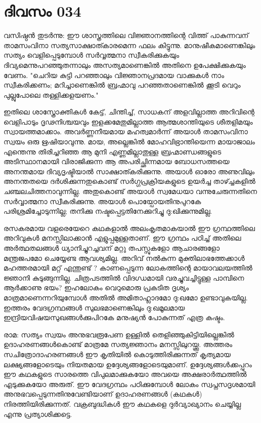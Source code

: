 \newpage
\section{ദിവസം 034}


വസിഷ്ഠന്‍ തുടര്‍ന്നു: ഈ ശാസ്ത്രത്തിലെ വിജ്ഞാനത്തിന്റെ വിത്ത്‌ പാകുന്നവന്‌  താമസംവിനാ സത്യസാക്ഷാത്കാരമെന്ന ഫലം കിട്ടുന്നു. മാനുഷീകമാണെങ്കിലും സത്യം വെളിപ്പെടുമ്പോള്‍ സര്‍വ്വത്മനാ സ്വീകരിക്കുകയും ദിവ്യമെന്നുപറഞ്ഞുതന്നാലും അസത്യമാണെങ്കില്‍ അതിനെ ഉപേക്ഷിക്കുകയും വേണം. "ചെറിയ കുട്ടി പറഞ്ഞാലും വിജ്ഞാനപ്രദമായ വാക്കുകള്‍ നാം സ്വീകരിക്കണം;  മറിച്ചാണെങ്കില്‍ ബ്രഹ്മാവു പറഞ്ഞതാണെങ്കില്‍ ക്കൂടി വെറും പുല്ലുപോലെ തള്ളിക്കളയണം."

ഇതിലെ ശാസ്ത്രോക്തികള്‍ കേട്ട്‌, ചിന്തിച്ച്‌, സാധകന്‌ അളവില്ലാത്ത അറിവിന്റെ വെളിപാടും ദൃഢനിശ്ചയവും ഇളക്കമേതുമില്ലാത്ത ആത്മശാന്തിയുടെ ശീതളിമയും സ്വായത്തമാക്കാം. അവര്‍ണ്ണനീയമായ മഹത്വമാര്‍ന്ന് അയാള്‍ താമസംവിനാ സ്വയം ഒരു ഋഷിയാവുന്നു. മായ, അല്ലെങ്കില്‍ മോഹവിഭ്രാന്തിയെന്ന മായാജാലം എന്തെന്നു തിരിച്ചറിഞ്ഞ ആ മുനി എണ്ണമില്ലാതുള്ള ബ്രഹ്മാണ്ഡങ്ങളുടെ അടിസ്ഥാനമായി വിരാജിക്കുന്ന ആ അപരിച്ഛിന്നമായ ബോധസത്തയെ അനന്തമായ ദിവ്യദൃഷ്ടിയാല്‍ സാക്ഷാത്കരിക്കുന്നു. അയാള്‍ ഓരോ അണുവിലും അനന്തതയെ ദര്‍ശിക്കുന്നതുകൊണ്ട്‌ സര്‍ഗ്ഗപ്രക്രിയകളുടെ ഉയര്‍ച്ച താഴ്ച്ചകളില്‍ ചഞ്ചലചിത്തനാവുന്നില്ല. അതുകൊണ്ട്‌ അയാള്‍ സ്വമേധയാ വന്നുചേരുന്നതിനെ സര്‍വ്വാത്മനാ സ്വീകരിക്കുന്നു. അയാള്‍ പൊയ്പോയതിനുപുറകേ പരിശ്രമിച്ചോടുന്നില്ല; തനിക്കു നഷ്ടപ്പെട്ടതിനേക്കുറിച്ചു ദു:ഖിക്കുന്നുമില്ല. 

രസകരമായ വളരെയേറെ കഥകളാല്‍ അലംകൃതമാകയാല്‍ ഈ ഗ്രന്ഥത്തിലെ അറിവുകള്‍ മനസ്സിലാക്കാന്‍ എളുപ്പമുള്ളതാണ്‌. ഈ ഗ്രന്ഥം പഠിച്ച്‌ അതിലെ അര്‍ത്ഥതലങ്ങള്‍ ധ്യാനിച്ചുറച്ചവന്‌ മറ്റു തപസ്സുകളോ ആചാരങ്ങളോ മന്ത്രജപമോ ചെയ്യേണ്ട ആവശ്യമില്ല. അറിവ്‌ നല്‍കുന്ന മുക്തിലാഭത്തേക്കാള്‍ മഹത്തരമായി  മറ്റ്  എന്തുണ്ട് ? കാണപ്പെടുന്ന ലോകത്തിന്റെ മായാവലയത്തില്‍ ജ്ഞാനി കുടുങ്ങുന്നില്ല. ചിത്രപടത്തില്‍ വിദഗ്ധമായി വരച്ചുവച്ചിട്ടുള്ള പാമ്പിനെ ആര്‍ക്കാണു ഭയം? ഇഹലോകം വെറുമൊരു പ്രകടിത ദൃശ്യം മാത്രമാണെന്നറിയുമ്പോള്‍ അതില്‍ അമിതാഹ്ലാദമോ ദു:ഖമോ ഉണ്ടാവുകയില്ല. ഇത്തരം വേദഗ്രന്ഥങ്ങള്‍ സുലഭമാണെങ്കിലും ദു:ഖമൂലമായ ഇന്ദ്രിയവിഷയസുഖങ്ങള്‍ക്കുപിറകേ മനുഷ്യന്‍ പോകുന്നത്‌ എത്ര കഷ്ടം.

രാമ: സത്യം സ്വയം അനുഭവരൂപേണ ഉള്ളില്‍ തെളിഞ്ഞുകിട്ടിയില്ലെങ്കില്‍ ഉദാഹരണങ്ങള്‍കൊണ്ട്‌ മാത്രമേ സത്യജ്ഞാനം മനസ്സിലുറയ്ക്കൂ. അത്തരം സചിത്രോദാഹരണങ്ങള്‍ ഈ കൃതിയില്‍ കൊടുത്തിരിക്കുന്നത്‌ കൃത്യമായ ലക്ഷ്യങ്ങളോടെയും നിയതമായ ഉദ്ദേശ്യങ്ങളോടെയുമാണ്‌. ഉദ്ദേശ്യങ്ങള്‍ക്കപ്പുറം ഈ കഥകളുടെ സാരത്തെ വിപുലമാക്കുകയോ അവയെ അക്ഷരാര്‍ത്ഥത്തില്‍ എടുക്കുകയോ അരുത്‌. ഈ വേദഗ്രന്ഥം പഠിക്കുമ്പോള്‍ ലോകം സ്വപ്നസദൃശമായി അനുഭവപ്പെടുന്നതിനുവേണ്ടിയാണ്‌ ഉദാഹരണങ്ങള്‍ (കഥകള്‍) നിരത്തിയിരിക്കുന്നത്‌. വക്രബുദ്ധികള്‍ ഈ കഥകളെ ദുര്‍വ്യാഖ്യാനം ചെയ്യില്ല എന്നു പ്രത്യാശിക്കട്ടെ.
